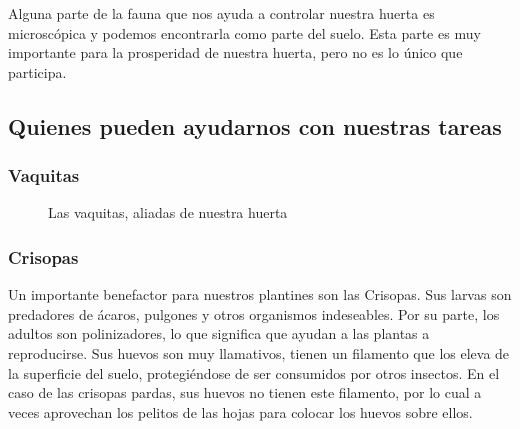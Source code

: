 \documentclass[../main.tex]{subfiles}
\begin{document}
Alguna parte de la fauna que nos ayuda a controlar nuestra huerta es microscópica y podemos encontrarla como parte del suelo. Esta parte es muy importante para la prosperidad de nuestra huerta, pero no es lo único que participa. \\

\subsection{Quienes pueden ayudarnos con nuestras tareas}

\subsubsection{Vaquitas}

\begin{figure}[H]
    \centering
    \caption*{\color{CompostGreen!50!black}Las vaquitas, aliadas de nuestra huerta}
    \label{insectos1}
\end{figure}

\subsubsection{Crisopas}

Un importante benefactor para nuestros plantines son las Crisopas. Sus larvas son predadores de ácaros, pulgones y otros organismos indeseables. Por su parte, los adultos son polinizadores, lo que significa que ayudan a las plantas a reproducirse. 
Sus huevos son muy llamativos, tienen un filamento que los eleva de la superficie del suelo, protegiéndose de ser consumidos por otros insectos. 
En el caso de las crisopas pardas, sus huevos no tienen este filamento, por lo cual a veces aprovechan los pelitos de las hojas para colocar los huevos sobre ellos.
\end{document}
